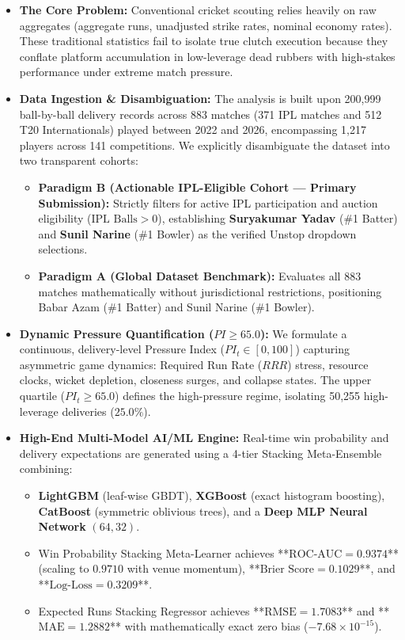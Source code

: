 \documentclass[11pt,a4paper]{article}
\begin{document}
\begin{itemize}[leftmargin=*,itemsep=4pt,topsep=2pt]
    \item \textbf{The Core Problem:} Conventional cricket scouting relies heavily on raw aggregates (aggregate runs, unadjusted strike rates, nominal economy rates). These traditional statistics fail to isolate true clutch execution because they conflate platform accumulation in low-leverage dead rubbers with high-stakes performance under extreme match pressure.
    
    \item \textbf{Data Ingestion \& Disambiguation:} The analysis is built upon 200,999 ball-by-ball delivery records across 883 matches (371 IPL matches and 512 T20 Internationals) played between 2022 and 2026, encompassing 1,217 players across 141 competitions. We explicitly disambiguate the dataset into two transparent cohorts:
    \begin{itemize}[itemsep=2pt]
        \item \textbf{Paradigm B (Actionable IPL-Eligible Cohort --- Primary Submission):} Strictly filters for active IPL participation and auction eligibility ($\text{IPL Balls} > 0$), establishing \textbf{Suryakumar Yadav} (\#1 Batter) and \textbf{Sunil Narine} (\#1 Bowler) as the verified Unstop dropdown selections.
        \item \textbf{Paradigm A (Global Dataset Benchmark):} Evaluates all 883 matches mathematically without jurisdictional restrictions, positioning Babar Azam (\#1 Batter) and Sunil Narine (\#1 Bowler).
    \end{itemize}

    \item \textbf{Dynamic Pressure Quantification ($PI \ge 65.0$):} We formulate a continuous, delivery-level Pressure Index ($PI_t \in [0, 100]$) capturing asymmetric game dynamics: Required Run Rate ($RRR$) stress, resource clocks, wicket depletion, closeness surges, and collapse states. The upper quartile ($PI_t \ge 65.0$) defines the high-pressure regime, isolating 50,255 high-leverage deliveries ($25.0\%$).

    \item \textbf{High-End Multi-Model AI/ML Engine:} Real-time win probability and delivery expectations are generated using a 4-tier Stacking Meta-Ensemble combining:
    \begin{itemize}[itemsep=1pt]
        \item \textbf{LightGBM} (leaf-wise GBDT), \textbf{XGBoost} (exact histogram boosting), \textbf{CatBoost} (symmetric oblivious trees), and a \textbf{Deep MLP Neural Network} $(64, 32)$.
        \item Win Probability Stacking Meta-Learner achieves **$\text{ROC-AUC} = 0.9374$** (scaling to $0.9710$ with venue momentum), **$\text{Brier Score} = 0.1029$**, and **$\text{Log-Loss} = 0.3209$**.
        \item Expected Runs Stacking Regressor achieves **$\text{RMSE} = 1.7083$** and **$\text{MAE} = 1.2882$** with mathematically exact zero bias ($-7.68 \times 10^{-15}$).
    \end{itemize}


\end{itemize}
\end{document}
